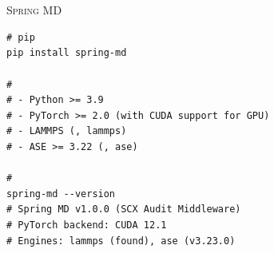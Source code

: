 \documentclass[12pt,a4paper]{article}
\theoremstyle{remark}
\newcommand{\SpringMD}{\textsc{Spring MD}}
\begin{document}
\section{}

\SpringMD{}

\begin{lstlisting}[caption={},label=lst:install]
# pip
pip install spring-md

# 
# - Python >= 3.9
# - PyTorch >= 2.0 (with CUDA support for GPU)
# - LAMMPS (, lammps)
# - ASE >= 3.22 (, ase)

# 
spring-md --version
# Spring MD v1.0.0 (SCX Audit Middleware)
# PyTorch backend: CUDA 12.1
# Engines: lammps (found), ase (v3.23.0)
\end{lstlisting}
\end{document}
